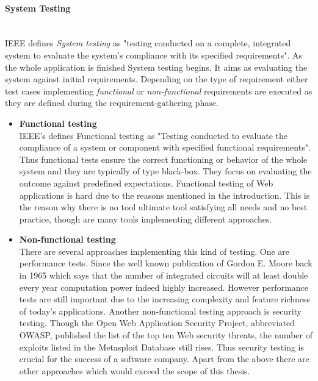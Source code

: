 \documentclass[12pt, notitlepage]{article}
\begin{document}
\paragraph{System Testing} ~\\
IEEE defines \textit{System testing} as\cite{ieee-definition} "testing conducted on a complete, integrated system to evaluate the system's compliance with its specified requirements". As the whole application is finished System testing begins. It aims as evaluating the system against initial requirements.
Depending on the type of requirement either test cases implementing \textit{functional} or \textit{non-functional} requirements are executed as they are defined during the requirement-gathering phase. 
\begin{itemize}
	\item \textbf{Functional testing}\\
	IEEE's defines Functional testing as \cite{ieee-definition}
	"Testing conducted to evaluate the compliance of a system or component with specified functional requirements". Thus functional tests ensure
	the correct functioning or behavior of the whole system and they are typically of type black-box.
	They focus on evaluating the outcome against predefined expectations. Functional testing of Web applications is hard due to the
	reasons mentioned in the introduction. This is the reason why there is no tool ultimate tool satisfying all needs and no best practice, though are many
	tools implementing different approaches.
	\item \textbf{Non-functional testing}\\
	There are several approaches implementing this kind of testing. One are performance tests. Since the well known publication of Gordon E. Moore back in 
	1965\cite{moore} which says that the number of integrated circuits will at least double every year computation power indeed highly increased.
	However performance tests are still important due to the increasing complexity and feature richness of today’s applications. Another non-functional 
	testing approach is security testing. Though the Open Web Application Security Project, abbreviated OWASP\cite{owasp}, published the list of the top ten
	Web security threats, the number of exploits listed in the Metasploit Database\cite{metasploit} still rises. Thus security testing is crucial for the success
	of a software company. Apart from the above there are other approaches which would exceed the scope of this thesis. 
\end{itemize}
\end{document}
